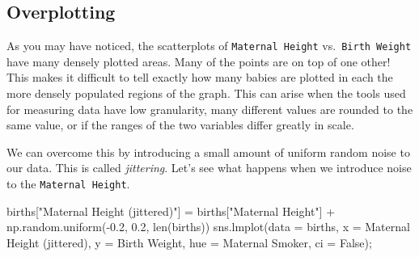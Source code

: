 \documentclass[
  letterpaper,
  DIV=11,
  numbers=noendperiod]{scrreprt}
\newenvironment{Shaded}{\begin{snugshade}}{\end{snugshade}}
\newcommand{\BuiltInTok}[1]{\textcolor[rgb]{0.00,0.23,0.31}{#1}}
\newcommand{\FloatTok}[1]{\textcolor[rgb]{0.68,0.00,0.00}{#1}}
\newcommand{\NormalTok}[1]{\textcolor[rgb]{0.00,0.23,0.31}{#1}}
\newcommand{\OperatorTok}[1]{\textcolor[rgb]{0.37,0.37,0.37}{#1}}
\newcommand{\StringTok}[1]{\textcolor[rgb]{0.13,0.47,0.30}{#1}}
\newcommand{\VariableTok}[1]{\textcolor[rgb]{0.07,0.07,0.07}{#1}}
\begin{document}
\hypertarget{overplotting}{%
\subsection{Overplotting}\label{overplotting}}

As you may have noticed, the scatterplots of \texttt{Maternal\ Height}
vs.~\texttt{Birth\ Weight} have many densely plotted areas. Many of the
points are on top of one other! This makes it difficult to tell exactly
how many babies are plotted in each the more densely populated regions
of the graph. This can arise when the tools used for measuring data have
low granularity, many different values are rounded to the same value, or
if the ranges of the two variables differ greatly in scale.

We can overcome this by introducing a small amount of uniform random
noise to our data. This is called \emph{jittering}. Let's see what
happens when we introduce noise to the \texttt{Maternal\ Height}.

\begin{Shaded}
\begin{Highlighting}[]
\NormalTok{births[}\StringTok{"Maternal Height (jittered)"}\NormalTok{] }\OperatorTok{=}\NormalTok{ births[}\StringTok{"Maternal Height"}\NormalTok{] }\OperatorTok{+}\NormalTok{ np.random.uniform(}\OperatorTok{{-}}\FloatTok{0.2}\NormalTok{, }\FloatTok{0.2}\NormalTok{, }\BuiltInTok{len}\NormalTok{(births))}
\NormalTok{sns.lmplot(data }\OperatorTok{=}\NormalTok{ births, x }\OperatorTok{=} \StringTok{\textquotesingle{}Maternal Height (jittered)\textquotesingle{}}\NormalTok{, y }\OperatorTok{=} \StringTok{\textquotesingle{}Birth Weight\textquotesingle{}}\NormalTok{, }
\NormalTok{           hue }\OperatorTok{=} \StringTok{\textquotesingle{}Maternal Smoker\textquotesingle{}}\NormalTok{, ci }\OperatorTok{=} \VariableTok{False}\NormalTok{)}\OperatorTok{;}
\end{Highlighting}
\end{Shaded}
\end{document}
